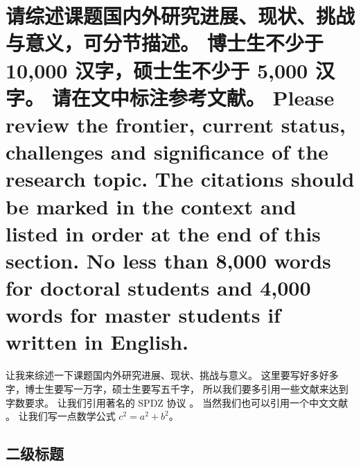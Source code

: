 \documentclass[a4paper,zihao=-4,AutoFakeBold]{ctexart}
\begin{document}
\vspace{-1.3cm}

\kaishu
\setlength{\parskip}{0.5\baselineskip}
\linespread{1.75}\selectfont

\makeatletter
{}
\makeatother




\section{请综述课题国内外研究进展、现状、挑战与意义，可分节描述。
    博士生不少于 10,000 汉字，硕士生不少于 5,000 汉字。
    请在文中标注参考文献。 
    Please review the frontier, current status, 
    challenges and significance of the research topic. 
    The citations should be marked in the context 
    and listed in order at the end of this section. 
    No less than 8,000 words for doctoral students 
    and 4,000 words for master students if written in English.}


让我来综述一下课题国内外研究进展、现状、挑战与意义。
这里要写好多好多字，博士生要写一万字，硕士生要写五千字，
所以我们要多引用一些文献来达到字数要求。
让我们引用著名的 SPDZ 协议 \cite{SPDZ}。
当然我们也可以引用一个中文文献 \cite{ZJSD}。
让我们写一点数学公式 $c^2 = a^2 + b^2$。


\subsection{二级标题}\label{sub}
\end{document}
